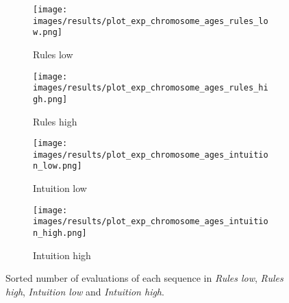 \begin{figure}[ht]
	\begin{subfigure}{0.49\linewidth}
	\centering
	\texttt{[image: images/results/plot\_exp\_chromosome\_ages\_rules\_low.png]}
	\caption{Rules low}
	\label{fig:exp_age_rules_low}
	\end{subfigure}
	\hfill
	\begin{subfigure}{0.49\linewidth}
	\centering
	\texttt{[image: images/results/plot\_exp\_chromosome\_ages\_rules\_high.png]}
	\caption{Rules high}
	\label{fig:exp_age_rules_high}
	\end{subfigure}
	\begin{subfigure}{0.49\linewidth}
	\centering
	\texttt{[image: images/results/plot\_exp\_chromosome\_ages\_intuition\_low.png]}
	\caption{Intuition low}
	\label{fig:exp_age_intuition_low}
	\end{subfigure}
	\hfill
	\begin{subfigure}{0.49\linewidth}
	\centering
	\texttt{[image: images/results/plot\_exp\_chromosome\_ages\_intuition\_high.png]}
	\caption{Intuition high}
	\label{fig:exp_age_intuition_high}
	\end{subfigure}
	\caption{Sorted number of evaluations of each sequence in \emph{Rules
	low}, \emph{Rules high}, \emph{Intuition low} and \emph{Intuition high}.}
	\label{fig:exp_ages1}
\end{figure}

